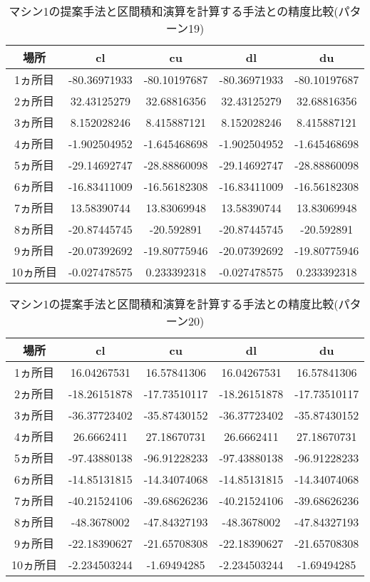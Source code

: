 \documentclass[11pt,a4paper]{jsreport}
\theoremstyle{definition}
\begin{document}
\begin{table}[H]
\centering
\begin{tabular}{|c|c|c|c|c|}
\hline
場所 & cl & cu & dl & du \\ \hline
1ヵ所目 & -80.36971933 & -80.10197687 & -80.36971933 & -80.10197687 \\ \hline
2ヵ所目 & 32.43125279 & 32.68816356 & 32.43125279 & 32.68816356 \\ \hline
3ヵ所目 & 8.152028246 & 8.415887121 & 8.152028246 & 8.415887121 \\ \hline
4ヵ所目 & -1.902504952 & -1.645468698 & -1.902504952 & -1.645468698 \\ \hline
5ヵ所目 & -29.14692747 & -28.88860098 & -29.14692747 & -28.88860098 \\ \hline
6ヵ所目 & -16.83411009 & -16.56182308 & -16.83411009 & -16.56182308 \\ \hline
7ヵ所目 & 13.58390744 & 13.83069948 & 13.58390744 & 13.83069948 \\ \hline
8ヵ所目 & -20.87445745 & -20.592891 & -20.87445745 & -20.592891 \\ \hline
9ヵ所目 & -20.07392692 & -19.80775946 & -20.07392692 & -19.80775946 \\ \hline
10ヵ所目 & -0.027478575 & 0.233392318 & -0.027478575 & 0.233392318 \\ \hline
\end{tabular}
\caption{マシン1の提案手法と区間積和演算を計算する手法との精度比較(パターン19)}
\end{table}

\begin{table}[H]
\centering
\begin{tabular}{|c|c|c|c|c|}
\hline
場所 & cl & cu & dl & du \\ \hline
1ヵ所目 & 16.04267531 & 16.57841306 & 16.04267531 & 16.57841306 \\ \hline
2ヵ所目 & -18.26151878 & -17.73510117 & -18.26151878 & -17.73510117 \\ \hline
3ヵ所目 & -36.37723402 & -35.87430152 & -36.37723402 & -35.87430152 \\ \hline
4ヵ所目 & 26.6662411 & 27.18670731 & 26.6662411 & 27.18670731 \\ \hline
5ヵ所目 & -97.43880138 & -96.91228233 & -97.43880138 & -96.91228233 \\ \hline
6ヵ所目 & -14.85131815 & -14.34074068 & -14.85131815 & -14.34074068 \\ \hline
7ヵ所目 & -40.21524106 & -39.68626236 & -40.21524106 & -39.68626236 \\ \hline
8ヵ所目 & -48.3678002 & -47.84327193 & -48.3678002 & -47.84327193 \\ \hline
9ヵ所目 & -22.18390627 & -21.65708308 & -22.18390627 & -21.65708308 \\ \hline
10ヵ所目 & -2.234503244 & -1.69494285 & -2.234503244 & -1.69494285 \\ \hline
\end{tabular}
\caption{マシン1の提案手法と区間積和演算を計算する手法との精度比較(パターン20)}
\end{table}
\end{document}
